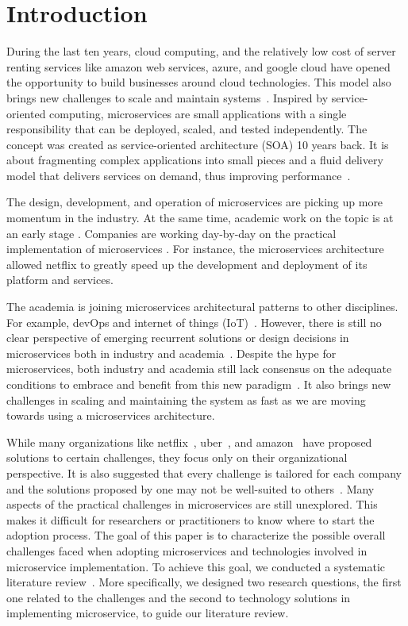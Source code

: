 
\section{Introduction}

During the last ten years, cloud computing, and the relatively low cost of server renting services like amazon web services, azure, and google cloud have opened the opportunity to build businesses around cloud technologies. This model also brings new challenges to scale and maintain systems~\cite{Claus2016}. Inspired by service-oriented computing, microservices are small applications with a single responsibility that can be deployed, scaled, and tested independently. The concept was created as service-oriented architecture (SOA) 10 years back. It is about fragmenting complex applications into small pieces and a fluid delivery model that delivers services on demand, thus improving performance~\cite{Larrucea2018}.

The design, development, and operation of microservices are picking up more momentum in the industry. At the same time, academic work on the topic is at an early stage \cite{Soldani2018, Dragoni2017, Olaf2016}. 
Companies are working day-by-day on the practical implementation of microservices \cite{Kevin2015, Alpers2015}. For instance, the microservices architecture allowed netflix \cite{Meshenberg2016} to greatly speed up the development and deployment of its platform and services.

The academia is joining microservices architectural patterns to other disciplines. For example, devOps and internet of things (IoT)~\cite{Osses2019}. However, there is still no clear perspective of emerging recurrent solutions or design decisions in microservices both in industry and academia~\cite{Soldani2018}. Despite the hype for microservices, both industry and academia still lack consensus on the adequate conditions to embrace and benefit from this new paradigm~\cite{Dragoni2017}. It also brings new challenges in scaling and maintaining the system as fast as we are moving towards using a microservices architecture.

While many organizations like netflix~\cite{Meshenberg2016}, uber~\cite{Uber}, and amazon~\cite{Amazon} have proposed solutions to certain challenges, they focus only on their organizational perspective. It is also suggested that every challenge is tailored for each company and the solutions proposed by one may not be well-suited to others~\cite{Kevin2015}. Many aspects of the practical challenges in microservices are still unexplored. This makes it difficult for researchers or practitioners to know where to start the adoption process. The goal of this paper is to characterize the possible overall challenges faced when adopting microservices and technologies involved in microservice implementation. To achieve this goal, we conducted a systematic literature review~\cite{Kitchenham2007}. More specifically, we designed two research questions, the first one related to the challenges and the second to technology solutions in implementing microservice, to guide our literature review. 

